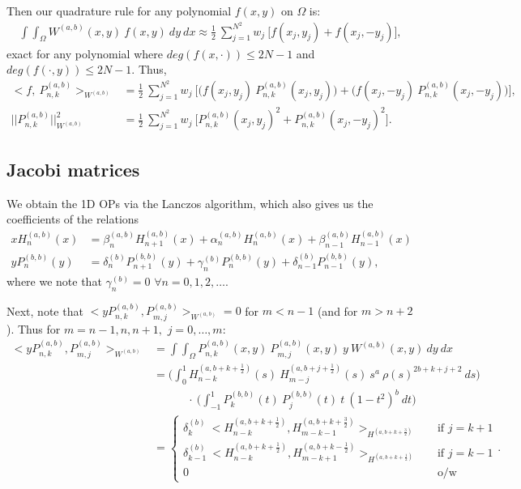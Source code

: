 \documentclass[11pt, oneside]{article}   	%
\newcommand{\half}{\frac{1}{2}}
\newcommand{\Pnk}{P_{n,k}}
\newcommand{\Pnkab}{P_{n,k}^{(a,b)}}
\newcommand{\Wab}{{W^{(a,b)}}}
\newcommand{\Pmjab}{P_{m,j}^{(a,b)}}
\begin{document}
Then our quadrature rule for any polynomial \(f(x,y)\) on \(\Omega\) is:
\begin{align}
\int \int_\Omega W^{(a,b)}(x,y) \: f(x,y) \: dy \: dx \approx \half \: \sum_{j=1}^{N^2} w_j \: \big[ f(x_j, y_j) + f(x_j, -y_j) \big],
\end{align}
exact for any polynomial where \(deg(f(x,\cdot)) \le 2N-1\) and \(deg(f(\cdot,y)) \le 2N-1\). Thus,
\begin{align}
< f, \: \Pnk^{(a,b)} >_{W^{(a,b)}} &= \half \: \sum_{j=1}^{N^2} w_j \: \big[ \big(f(x_j, y_j) \: \Pnk^{(a,b)}(x_j, y_j)\big) +\big(f(x_j, -y_j) \: \Pnk^{(a,b)}(x_j, -y_j)\big) \big], \\
|| \Pnk^{(a,b)} ||_{W^{(a,b)}}^2 &= \half \: \sum_{j=1}^{N^2} w_j \: \big[ \Pnk^{(a,b)}(x_j, y_j)^2 + \Pnk^{(a,b)}(x_j, -y_j)^2 \big].
\end{align}


\subsection{Jacobi matrices}

We obtain the 1D OPs via the Lanczos algorithm, which also gives us the coefficients of the relations
\begin{align}
x H_n^{(a,b)}(x) &= \beta_n^{(a,b)} H_{n+1}^{(a,b)}(x) + \alpha_n^{(a,b)} H_n^{(a,b)}(x) + \beta_{n-1}^{(a,b)} H_{n-1}^{(a,b)}(x) \\
y P_n^{(b,b)}(y) &= \delta_n^{(b)} P_{n+1}^{(b,b)}(y) + \gamma_n^{(b)} P_n^{(b,b)}(y) + \delta_{n-1}^{(b)} P_{n-1}^{(b,b)}(y),
\end{align}
where we note that \(\gamma_n^{(b)} = 0\) \(\forall n = 0,1,2,\dots\).

Next, note that \(<y \Pnkab, P_{m,j}^{(a,b)}>_\Wab = 0\) for \(m < n-1\) (and for \(m > n+2\)). Thus for \(m = n-1, n, n+1,\) \(j = 0,\dots,m:\)
\begin{align}
<y \Pnkab, P_{m,j}^{(a,b)}>_\Wab &= \int \int_\Omega \Pnkab(x,y) \: \Pmjab(x,y) \: y \: \Wab(x,y) \: dy \: dx \\
&= \Big( \int^1_0 H_{n-k}^{(a, b+k+\half)}(s) \: H_{m-j}^{(a, b+j+\half)}(s) \: s^a \: \rho(s)^{2b+k+j+2} \: ds \Big) \nonumber \\
& \quad \quad \quad\cdot \: \Big( \int^1_{-1} P_k^{(b,b)}(t) \: P_j^{(b,b)}(t) \: t \: (1-t^2)^b \: dt \Big) \\
&= \begin{cases}
    	\delta_k^{(b)} \: <H_{n-k}^{(a, b+k+\half)}, H_{m-k-1}^{(a, b+k+\frac{3}{2})}>_{H^{(a, b+k+\frac{3}{2})}} \quad& \text{if } j = k+1 \\
	\delta_{k-1}^{(b)} \: <H_{n-k}^{(a, b+k+\half)}, H_{m-k+1}^{(a, b+k-\half)}>_{H^{(a, b+k+\half)}} \quad& \text{if } j = k-1 \\
	0 & \text{o/w}
      \end{cases}.
\end{align}
\end{document}
